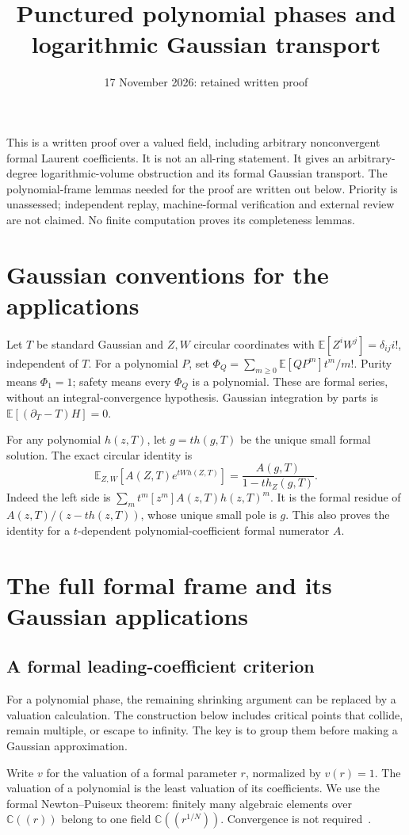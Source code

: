 \documentclass[11pt]{article}
\title{Punctured polynomial phases and logarithmic Gaussian transport}
\author{}\date{17 November 2026: retained written proof}
\theoremstyle{definition}\newtheorem{definition}[theorem]{Definition}
\theoremstyle{remark}\newtheorem{remark}[theorem]{Remark}
\newcommand{\E}{\mathbb E}
\newcommand{\C}{\mathbb C}
\begin{document}
\maketitle
This is a written proof over a valued field, including arbitrary
nonconvergent formal Laurent coefficients. It is not an all-ring
statement. It gives an arbitrary-degree logarithmic-volume obstruction and
its formal Gaussian transport. The polynomial-frame lemmas needed
for the proof are written out below. Priority is unassessed;
independent replay, machine-formal verification and external review
are not claimed. No finite computation proves its completeness lemmas.

\section{Gaussian conventions for the applications}
Let $T$ be standard Gaussian and $Z,W$ circular coordinates with
$\E[Z^iW^j]=\delta_{ij}i!$, independent of $T$. For a polynomial
$P$, set $\Phi_Q=\sum_{m\geq0}\E[QP^m]t^m/m!$. Purity means
$\Phi_1=1$; safety means every $\Phi_Q$ is a polynomial.
These are formal series, without an integral-convergence hypothesis.
Gaussian integration by parts is $\E[(\partial_T-T)H]=0$.

For any polynomial $h(z,T)$, let $g=th(g,T)$ be the unique small
formal solution. The exact circular identity is
\[
 \E_{Z,W}[A(Z,T)e^{tWh(Z,T)}]
       =\frac{A(g,T)}{1-th_Z(g,T)}.
\]
Indeed the left side is $\sum_m t^m[z^m]A(z,T)h(z,T)^m$.
It is the formal residue of $A(z,T)/(z-th(z,T))$, whose unique
small pole is $g$. This also proves the identity for a
$t$-dependent polynomial-coefficient formal numerator $A$.

\section{The full formal frame and its Gaussian applications}
\subsection{A formal leading-coefficient criterion}\label{sec:stationaryballs}

For a polynomial phase, the remaining shrinking argument can be
replaced by a valuation calculation. The construction below includes
critical points that collide, remain multiple, or escape to infinity.
The key is to group them before making a Gaussian approximation.

Write $v$ for the valuation of a formal parameter $r$, normalized by
$v(r)=1$. The valuation of a polynomial is the least valuation of its
coefficients. We use the formal Newton--Puiseux theorem: finitely many
algebraic elements over $\C((r))$ belong to one field
$\C((r^{1/N}))$. Convergence is not required~\cite[Chapter~2]{Wall}.
\end{document}
